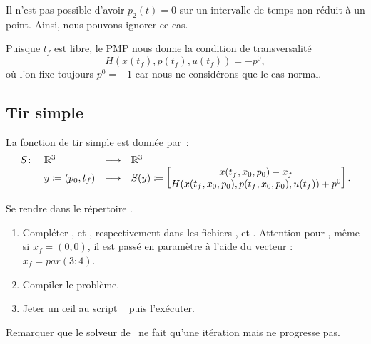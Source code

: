 \begin{myremark}
    \anoter
    Il n'est pas possible d'avoir $p_2(t) = 0$ sur un intervalle de temps non r\'eduit \`a un point. Ainsi, nous pouvons ignorer ce cas.
\end{myremark}

Puisque $t_f$ est libre, le PMP nous donne la condition de transversalit\'e \[H(x(t_f), p(t_f), u(t_f)) = -p^0, \]
o\`u l'on fixe toujours $p^0=-1$ car nous ne consid\'erons que le cas normal. 
%

\subsection{Tir simple}

La fonction de tir simple est donn\'ee par~:
\begin{equation*}
    \begin{array}{rlll}
        S \colon    & \mathbb{R}^3      & \longrightarrow   & \mathbb{R}^3 \\
        & y\coloneqq(p_0, t_f)  & \longmapsto       & S(y) \coloneqq
        \begin{bmatrix}
            x(t_f,x_0,p_0) - x_f \\
            H(x(t_f,x_0,p_0),p(t_f,x_0,p_0),u(t_f))+p^0
        \end{bmatrix}.
    \end{array}
\end{equation*}

\begin{myExercice} Se rendre dans le r\'epertoire  .
    \begin{enumerate}
        \item Compl\'eter ,  et , respectivement dans les fichiers ,  et .
            Attention pour , m\^eme si $x_f = (0,0)$, il est pass\'e en param\`etre \`a l'aide du vecteur  : $x_f = par(3:4)$.
        \item Compiler le probl\`eme.
        \item Jeter un \oe il au script \matlab\  puis l'ex\'ecuter.
    \end{enumerate}
\end{myExercice}

\begin{myremark}
    \anoter
    Remarquer que le solveur  de \matlab\ ne fait qu'une it\'eration mais ne progresse pas.
\end{myremark}

